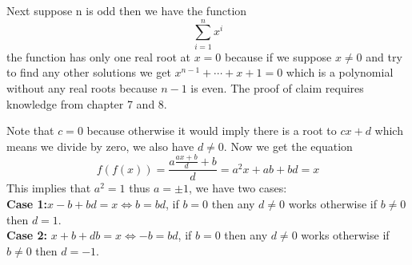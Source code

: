 \begin{problem}
{	Next suppose n is odd then we have the function $$\sum_{i=1}^{n}x^i$$ the function has only one real root at $x=0$ because if we suppose $x\neq0$ and try to find any other solutions we get $x^{n-1}+\cdots+x+1=0$ which is a polynomial without any real roots because $n-1$ is even. The proof of claim requires knowledge from chapter 7 and 8.
	}
\end{problem}

\begin{problem}
	Note that $c=0$ because otherwise it would imply there is a root to $cx+d$ which means we divide by zero, we also have $d\neq 0$. Now we get the equation $$f(f(x))=\frac{a\frac{ax+b}{d}+b}{d}=a^2x+ab+bd=x$$
	This implies that $a^2=1$ thus $a=\pm 1$, we have two cases:\\
	\textbf{Case 1:}$x-b+bd=x\iff b=bd$, if $b=0$ then any $d\neq 0$ works otherwise if $b\neq 0$ then $d=1$.\\
	\textbf{Case 2:} $x+b+db=x\iff-b=bd$, if $b=0$ then any $d\neq 0$ works otherwise if $b\neq0$ then $d=-1$.
\end{problem}
